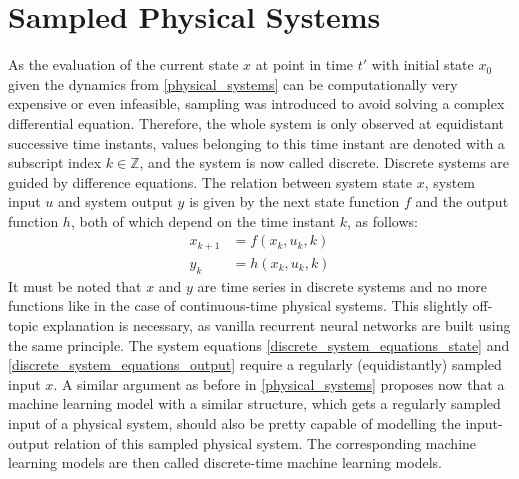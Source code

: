 \documentclass[draft,final]{vutinfth} %
\begin{document}
    \section{Sampled Physical Systems} \label{sampled_physical_systems}
    As the evaluation of the current state $x$ at point in time $t'$ with initial state $x_0$ given the dynamics from \ref{physical_systems} can be computationally very expensive or even infeasible, sampling was introduced to avoid solving a complex differential equation.
    Therefore, the whole system is only observed at equidistant successive time instants, values belonging to this time instant are denoted with a subscript index $k \in \mathbb{Z}$, and the system is now called discrete.
    Discrete systems are guided by difference equations. The relation between system state $x$, system input $u$ and system output $y$ is given by the next state function $f$ and the output function $h$, both of which depend on the time instant $k$, as follows:
    \begin{align} 
        \label{discrete_system_equations_state}
        x_{k+1} &= f(x_k,u_k,k) \\
        \label{discrete_system_equations_output}
        y_k &= h(x_k,u_k,k)
    \end{align} 
    It must be noted that $x$ and $y$ are time series in discrete systems and no more functions like in the case of continuous-time physical systems.
    This slightly off-topic explanation is necessary, as vanilla recurrent neural networks are built using the same principle. 
    The system equations \ref{discrete_system_equations_state} and \ref{discrete_system_equations_output} require a regularly (equidistantly) sampled input $x$.
    A similar argument as before in \ref{physical_systems} proposes now that a machine learning model with a similar structure, which gets a regularly sampled input of a physical system, should also be pretty capable of modelling the input-output relation of this sampled physical system.
    The corresponding machine learning models are then called discrete-time machine learning models.
    
\end{document}

